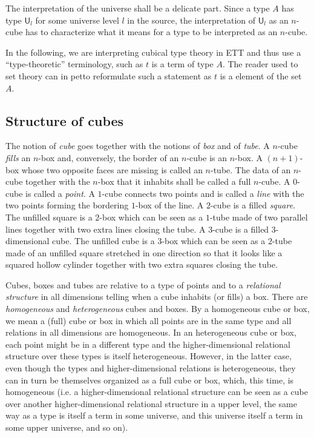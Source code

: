 \documentclass{article}
\newcommand{\sort}[1]{\mathsf{U}_{#1}}
\begin{document}
The interpretation of the universe shall be a delicate
part. Since a type $A$ has type $\sort{l}$ for some universe level $l$
in the source, the interpretation of $\sort{l}$ as an $n$-cube has to
characterize what it means for a type to be interpreted as an $n$-cube.

In the following, we are interpreting cubical type theory in ETT and
thus use a ``type-theoretic'' terminology, such as $t$ is a term of
type $A$. The reader used to set theory can in petto reformulate such
a statement as $t$ is a element of the set $A$.

\subsection{Structure of cubes}

The notion of {\em cube} goes together with the notions of {\em box} and of {\em tube}.
A $n$-cube {\em fills} an $n$-box and, conversely, the border of an $n$-cube
is an $n$-box. A $(n+1)$-box whose two opposite faces are missing is
called an $n$-tube. The data of an $n$-cube together with the $n$-box
that it inhabits shall be called a full $n$-cube. A
$0$-cube is called a {\em point}. A $1$-cube connects two points and is
called a {\em line} with the two points forming the bordering $1$-box of the
line. A $2$-cube is a filled {\em square}. The unfilled square is a $2$-box
which can be seen as a $1$-tube made of two parallel lines together
with two extra lines closing the tube.  A $3$-cube is a filled
3-dimensional cube. The unfilled cube is a $3$-box which can be seen
as a $2$-tube made of an unfilled square stretched in one direction so
that it looks like a squared hollow cylinder together with two extra squares
closing the tube.

Cubes, boxes and tubes are relative to a type of points and to a
{\em relational structure} in all dimensions telling when a cube inhabits
(or fills) a box. There are {\em homogeneous} and {\em heterogeneous} cubes and
boxes. By a homogeneous cube or box, we mean a (full) cube or box in
which all points are in the same type and all relations in all
dimensions are homogeneous. In an heterogeneous cube or box, each
point might be in a different type and the higher-dimensional
relational structure over these types is itself
heterogeneous. However, in the latter case, even though the types and
higher-dimensional relations is heterogeneous, they can in turn be
themselves organized as a full cube or box, which, this time, is
homogeneous (i.e. a higher-dimensional relational structure can be
seen as a cube over another higher-dimensional relational structure in
a upper level, the same way as a type is itself a term in some
universe, and this universe itself a term in some upper universe, and
so on).
\end{document}
